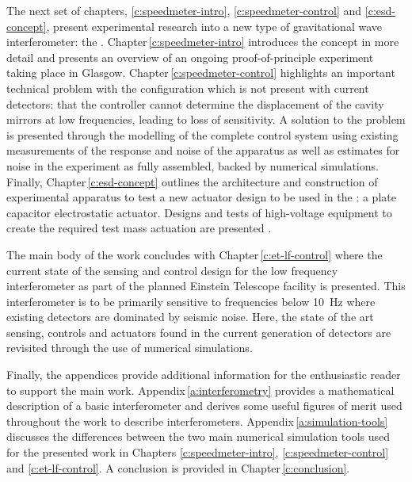 The next set of chapters, \ref{c:speedmeter-intro}, \ref{c:speedmeter-control} and \ref{c:esd-concept}, present experimental research into a new type of gravitational wave interferometer: the \SSM{}. Chapter\,\ref{c:speedmeter-intro} introduces the concept in more detail and presents an overview of an ongoing proof-of-principle experiment taking place in Glasgow. Chapter\,\ref{c:speedmeter-control} highlights an important technical problem with the \SSM{} configuration which is not present with current detectors: that the controller cannot determine the displacement of the cavity mirrors at low frequencies, leading to loss of sensitivity. A solution to the problem is presented through the modelling of the complete control system using existing measurements of the response and noise of the apparatus as well as estimates for noise in the experiment as fully assembled, backed by numerical simulations. Finally, Chapter\,\ref{c:esd-concept} outlines the architecture and construction of experimental apparatus to test a new actuator design to be used in the \SSMEXPT{}: a plate capacitor electrostatic actuator. Designs and tests of high-voltage equipment to create the required test mass actuation are presented .

The main body of the work concludes with Chapter\,\ref{c:et-lf-control} where the current state of the sensing and control design for the low frequency interferometer as part of the planned Einstein Telescope facility is presented. This interferometer is to be primarily sensitive to frequencies below \SI{10}{\hertz} where existing detectors are dominated by seismic noise. Here, the state of the art sensing, controls and actuators found in the current generation of detectors are revisited through the use of numerical simulations.

Finally, the appendices provide additional information for the enthusiastic reader to support the main work. Appendix\,\ref{a:interferometry} provides a mathematical description of a basic interferometer and derives some useful figures of merit used throughout the work to describe interferometers. Appendix\,\ref{a:simulation-tools} discusses the differences between the two main numerical simulation tools used for the presented work in Chapters \ref{c:speedmeter-intro}, \ref{c:speedmeter-control} and \ref{c:et-lf-control}. A conclusion is provided in Chapter\,\ref{c:conclusion}.